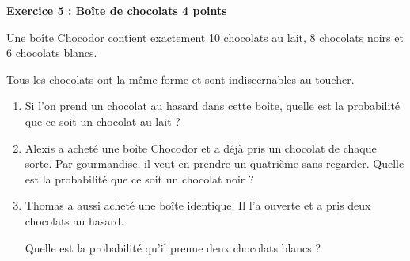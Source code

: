 \textbf{Exercice 5 : Boîte de chocolats \hfill 4 points}

\medskip

Une boîte \og Chocodor \fg{} contient exactement 10 chocolats au lait, 8 chocolats noirs et 6 chocolats blancs.

Tous les chocolats ont la même forme et sont indiscernables au toucher.

\medskip

\begin{enumerate}
\item Si l'on prend un chocolat au hasard dans cette boîte, quelle est la probabilité que ce soit un chocolat au lait ?
\item Alexis a acheté une boîte \og Chocodor\fg{} et a déjà pris un chocolat de chaque sorte. Par gourmandise, il veut en prendre un quatrième sans regarder. Quelle est la probabilité que ce soit un chocolat noir ?
\item Thomas a aussi acheté une boîte identique. Il l'a ouverte et a pris deux chocolats au hasard.

Quelle est la probabilité qu'il prenne deux chocolats blancs ?
\end{enumerate}

\vspace{0,5cm}

